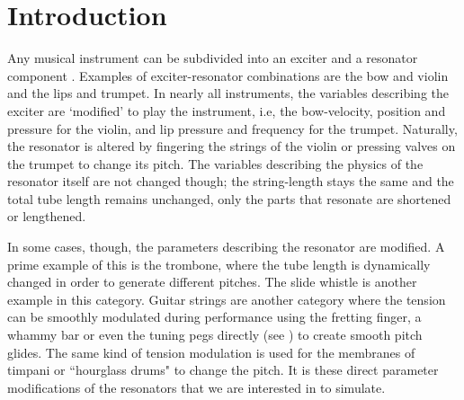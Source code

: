\section{Introduction}

 Any musical instrument can be subdivided into an exciter and a resonator component \cite{Borin1989}. Examples of exciter-resonator combinations are the bow and violin and the lips and trumpet. In nearly all instruments, the variables describing the exciter are `modified' to play the instrument, i.e, the bow-velocity, position and pressure for the violin, and lip pressure and frequency for the trumpet. Naturally, the resonator is altered by fingering the strings of the violin or pressing valves on the trumpet to change its pitch. The variables describing the physics of the resonator itself are not changed though; the string-length stays the same and the total tube length remains unchanged, only the parts that resonate are shortened or lengthened.

In some cases, though, the parameters describing the resonator are modified. A prime example of this is the trombone, where the tube length is dynamically changed in order to generate different pitches. The slide whistle is another example in this category. Guitar strings are another category where the tension can be smoothly modulated during performance using the fretting finger, a whammy bar or even the tuning pegs directly (see \cite{Gomm2011}) to create smooth pitch glides. The same kind of tension modulation is used for the membranes of timpani or ``hourglass drums" to change the pitch. %
It is these direct parameter modifications of the resonators that we are interested in to simulate.


